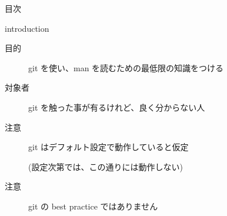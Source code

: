 
\begin{frame}{}{}
  \titlepage
\end{frame}

\begin{frame}{目次}{}
  \tableofcontents
\end{frame}

\begin{frame}{introduction}{}

  \begin{description}

  \item[目的] git を使い、man を読むための最低限の知識をつける
  \item[対象者] git を触った事が有るけれど、良く分からない人
  \item[注意] git はデフォルト設定で動作していると仮定

    (設定次第では、この通りには動作しない)
  \item[注意] \alert{git の best practice ではありません}

  \end{description}

\end{frame}
